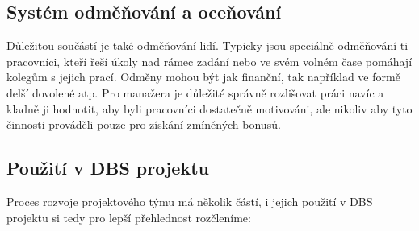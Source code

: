 \subsection{Systém odměňování a oceňování}
Důležitou součástí je také odměňování lidí. Typicky jsou speciálně odměňování ti pracovníci, kteří řeší úkoly nad rámec zadání nebo ve svém volném čase pomáhají kolegům s jejich prací. Odměny mohou být jak finanční, tak například ve formě delší dovolené atp. Pro manažera je důležité správně rozlišovat práci navíc a kladně ji hodnotit, aby byli pracovníci dostatečně motivováni, ale nikoliv aby tyto činnosti prováděli pouze pro získání zmíněných bonusů.

\subsection{Použití v DBS projektu}
Proces rozvoje projektového týmu má několik částí, i jejich použití v DBS projektu si tedy pro lepší přehlednost rozčleníme:

